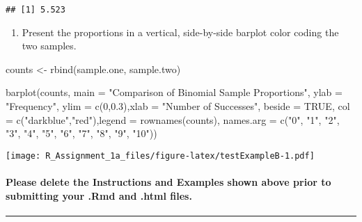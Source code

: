 \documentclass[
]{article}
\newenvironment{Shaded}{\begin{snugshade}}{\end{snugshade}}
\newcommand{\AttributeTok}[1]{\textcolor[rgb]{0.77,0.63,0.00}{#1}}
\newcommand{\ConstantTok}[1]{\textcolor[rgb]{0.00,0.00,0.00}{#1}}
\newcommand{\DecValTok}[1]{\textcolor[rgb]{0.00,0.00,0.81}{#1}}
\newcommand{\FloatTok}[1]{\textcolor[rgb]{0.00,0.00,0.81}{#1}}
\newcommand{\FunctionTok}[1]{\textcolor[rgb]{0.00,0.00,0.00}{#1}}
\newcommand{\NormalTok}[1]{#1}
\newcommand{\OtherTok}[1]{\textcolor[rgb]{0.56,0.35,0.01}{#1}}
\newcommand{\StringTok}[1]{\textcolor[rgb]{0.31,0.60,0.02}{#1}}
\providecommand{\tightlist}{%
  \setlength{\itemsep}{0pt}\setlength{\parskip}{0pt}}
\begin{document}
\begin{verbatim}
## [1] 5.523
\end{verbatim}

\begin{enumerate}
\def\labelenumi{(\alph{enumi})}
\setcounter{enumi}{1}
\tightlist
\item
  Present the proportions in a vertical, side-by-side barplot color
  coding the two samples.
\end{enumerate}

\begin{Shaded}
\begin{Highlighting}[]
\NormalTok{counts }\OtherTok{\textless{}{-}} \FunctionTok{rbind}\NormalTok{(sample.one, sample.two)}

\FunctionTok{barplot}\NormalTok{(counts, }\AttributeTok{main =} \StringTok{"Comparison of Binomial Sample Proportions"}\NormalTok{, }
  \AttributeTok{ylab =} \StringTok{"Frequency"}\NormalTok{, }\AttributeTok{ylim =} \FunctionTok{c}\NormalTok{(}\DecValTok{0}\NormalTok{,}\FloatTok{0.3}\NormalTok{),}\AttributeTok{xlab =} \StringTok{"Number of Successes"}\NormalTok{,}
  \AttributeTok{beside =} \ConstantTok{TRUE}\NormalTok{, }\AttributeTok{col =} \FunctionTok{c}\NormalTok{(}\StringTok{"darkblue"}\NormalTok{,}\StringTok{"red"}\NormalTok{),}\AttributeTok{legend =} \FunctionTok{rownames}\NormalTok{(counts),}
  \AttributeTok{names.arg =} \FunctionTok{c}\NormalTok{(}\StringTok{"0"}\NormalTok{, }\StringTok{"1"}\NormalTok{, }\StringTok{"2"}\NormalTok{, }\StringTok{"3"}\NormalTok{, }\StringTok{"4"}\NormalTok{, }\StringTok{"5"}\NormalTok{, }\StringTok{"6"}\NormalTok{, }\StringTok{"7"}\NormalTok{, }\StringTok{"8"}\NormalTok{, }\StringTok{"9"}\NormalTok{, }\StringTok{"10"}\NormalTok{))}
\end{Highlighting}
\end{Shaded}

\texttt{[image: R\_Assignment\_1a\_files/figure-latex/testExampleB-1.pdf]}

\hypertarget{please-delete-the-instructions-and-examples-shown-above-prior-to-submitting-your-.rmd-and-.html-files.}{%
\paragraph{Please delete the Instructions and Examples shown above prior
to submitting your .Rmd and .html
files.}\label{please-delete-the-instructions-and-examples-shown-above-prior-to-submitting-your-.rmd-and-.html-files.}}

\begin{center}\rule{0.5\linewidth}{0.5pt}\end{center}
\end{document}
